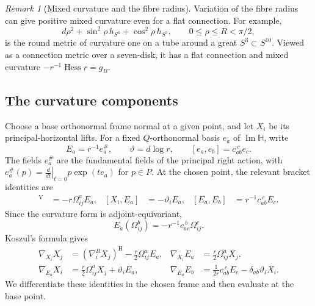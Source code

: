 \documentclass[12pt]{amsart}
\numberwithin{equation}{section}
\theoremstyle{remark}
\newtheorem{remark}[theorem]{Remark}
\newcommand{\Hh}{\mathbb H}
\newcommand{\Hess}{\operatorname{Hess}}
\newcommand{\hor}{\mathrm H}
\newcommand{\ver}{\mathrm V}
\begin{document}
\begin{remark}[Mixed curvature and the fibre radius]\label{rem:flatconnection}
Variation of the fibre radius can give positive mixed curvature even
for a flat connection. For example,
\[
d\rho^2+\sin^2\rho\,h_{S^6}+\cos^2\rho\,h_{S^3},
\qquad 0\le\rho\le R<\pi/2,
\]
is the round metric of curvature one on a tube around a great
\(S^3\subset S^{10}\). Viewed as a connection metric over a
seven-disk, it has a flat connection and mixed curvature
\(-r^{-1}\Hess r=g_B\).
\end{remark}

\subsection{The curvature components}
Choose a base orthonormal frame normal at a given point, and let
\(X_i\) be its principal-horizontal lifts. For a fixed \(Q\)-orthonormal
basis \(e_a\) of \(\operatorname{Im}\Hh\), write
\[
E_a=r^{-1}e_a^\#,\qquad \vartheta=d\log r,\qquad
[e_a,e_b]=c_{ab}^{\ c}e_c.
\]
The fields \(e_a^\#\) are the fundamental fields of the principal
right action, with
\(e_a^\#(p)=\left.\frac{d}{dt}\right|_{t=0}p\exp(te_a)\)
for \(p\in P\). At the chosen point, the relevant bracket identities are
\begin{align}
[X_i,X_j]^\ver&=-r\Omega_{ij}^aE_a,&
[X_i,E_a]&=-\vartheta_iE_a,&
[E_a,E_b]&=r^{-1}c_{ab}^{\ c}E_c.
\label{eq:brackets}
\end{align}
Since the curvature form is adjoint-equivariant,
\begin{equation}\label{eq:verticalderivative}
E_a(\Omega_{ij}^b)=-r^{-1}c_{ac}^{\ b}\Omega_{ij}^c.
\end{equation}
Koszul's formula gives
\begin{align}
\nabla_{X_i}X_j
  &=(\nabla_i^B X_j)^\hor-\frac r2\Omega_{ij}^aE_a,
&\nabla_{X_i}E_a&=\frac r2\Omega_{ij}^aX_j,
\label{eq:Koszul1}\\
\nabla_{E_a}X_i
  &=\frac r2\Omega_{ij}^aX_j+\vartheta_iE_a,
&\nabla_{E_a}E_b&=\frac1{2r}c_{ab}^{\ c}E_c-\delta_{ab}\vartheta_iX_i.
\label{eq:Koszul2}
\end{align}
We differentiate these identities in the chosen frame and then
evaluate at the base point.
\end{document}

